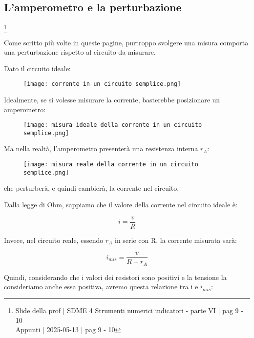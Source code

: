 \newpage 

\subsection{L'amperometro e la perturbazione}
\footnote{Slide della prof | SDME 4 Strumenti numerici indicatori - parte VI | pag 9 - 10 \\  
Appunti | 2025-05-13 | pag 9 - 10}

Come scritto più volte in queste pagine, purtroppo svolgere una misura comporta una perturbazione rispetto al circuito da misurare. \newline 

Dato il circuito ideale: 

\begin{figure}[h]
    \centering
    \texttt{[image: corrente in un circuito semplice.png]}
\end{figure}

Idealmente, se si volesse misurare la corrente, basterebbe posizionare un amperometro: 

\begin{figure}[h]
    \centering
    \texttt{[image: misura ideale della corrente in un circuito semplice.png]}
\end{figure}

Ma nella realtà, l'amperometro presenterà una resistenza interna $r_A$:

\begin{figure}[h]
    \centering
    \texttt{[image: misura reale della corrente in un circuito semplice.png]}
\end{figure}

che perturberà, e quindi cambierà, la corrente nel circuito. \newline 

Dalla legge di Ohm, sappiamo che il valore della corrente nel circuito ideale è:

{
    \Large 
    \begin{equation}
        i = \frac{v}{R}
    \end{equation}
}

Invece, nel circuito reale, essendo $r_A$ in serie con R, la corrente misurata sarà:

{
    \Large 
    \begin{equation}
        i_{mis} = \frac{v}{R + r_A}
    \end{equation}
}


Quindi, considerando che i valori dei resistori sono positivi e la tensione la consideriamo anche essa positiva, 
avremo questa relazione tra i e $i_{mis}$: 


